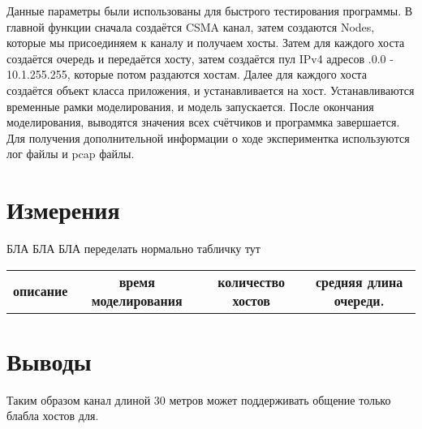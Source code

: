 \documentclass[a4peper, 12pt, titlepage, finall]{extreport}
\begin{document}
        Данные параметры были использованы для быстрого тестирования программы.
        В главной функции сначала создаётся CSMA канал, затем создаются Nodes, которые мы присоединяем к каналу и получаем хосты.
        Затем для каждого хоста создаётся очередь и передаётся хосту, затем создаётся пул IPv4 адресов {.0.0 - 10.1.255.255},
        которые потом раздаются хостам. Далее для каждого хоста создаётся объект класса приложения, и устанавливается на хост.
        Устанавливаются временные рамки моделирования, и модель запускается. После окончания моделирования, выводятся значения всех счётчиков и программка завершается.
        Для получения дополнительной информации о ходе экспериментка используются лог файлы и pcap файлы.
    \section{Измерения}
        БЛА БЛА БЛА переделать нормально табличку тут\\
        \begin{tabular}{lccc}
            \bf описание & \bf время моделирования & \bf количество хостов &\bf средняя длина очереди.  \\
        \end{tabular}

    \section{Выводы}
        Таким образом канал длиной 30 метров может поддерживать общение только блабла хостов для.
\end{document}
